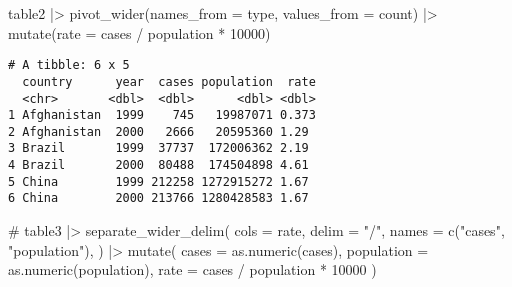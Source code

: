 \documentclass[
  letterpaper,
  DIV=11,
  numbers=noendperiod]{scrreprt}
\newenvironment{Shaded}{\begin{snugshade}}{\end{snugshade}}
\newcommand{\AttributeTok}[1]{\textcolor[rgb]{0.40,0.45,0.13}{#1}}
\newcommand{\CommentTok}[1]{\textcolor[rgb]{0.37,0.37,0.37}{#1}}
\newcommand{\DecValTok}[1]{\textcolor[rgb]{0.68,0.00,0.00}{#1}}
\newcommand{\FunctionTok}[1]{\textcolor[rgb]{0.28,0.35,0.67}{#1}}
\newcommand{\NormalTok}[1]{\textcolor[rgb]{0.00,0.23,0.31}{#1}}
\newcommand{\SpecialCharTok}[1]{\textcolor[rgb]{0.37,0.37,0.37}{#1}}
\newcommand{\StringTok}[1]{\textcolor[rgb]{0.13,0.47,0.30}{#1}}
\begin{document}
\begin{enumerate}
  \begin{tcolorbox}[enhanced jigsaw, left=2mm, rightrule=.15mm, bottomtitle=1mm, opacitybacktitle=0.6, leftrule=.75mm, opacityback=0, colframe=quarto-callout-note-color-frame, bottomrule=.15mm, coltitle=black, toptitle=1mm, colback=white, titlerule=0mm, colbacktitle=quarto-callout-note-color!10!white, title={Answer}, toprule=.15mm, breakable, arc=.35mm]

\begin{Shaded}
\begin{Highlighting}[]
\NormalTok{table2 }\SpecialCharTok{|\textgreater{}}
  \FunctionTok{pivot\_wider}\NormalTok{(}\AttributeTok{names\_from =}\NormalTok{ type,}
              \AttributeTok{values\_from =}\NormalTok{ count) }\SpecialCharTok{|\textgreater{}}
  \FunctionTok{mutate}\NormalTok{(}\AttributeTok{rate =}\NormalTok{ cases }\SpecialCharTok{/}\NormalTok{ population }\SpecialCharTok{*} \DecValTok{10000}\NormalTok{)}
\end{Highlighting}
\end{Shaded}

\begin{verbatim}
# A tibble: 6 x 5
  country      year  cases population  rate
  <chr>       <dbl>  <dbl>      <dbl> <dbl>
1 Afghanistan  1999    745   19987071 0.373
2 Afghanistan  2000   2666   20595360 1.29 
3 Brazil       1999  37737  172006362 2.19 
4 Brazil       2000  80488  174504898 4.61 
5 China        1999 212258 1272915272 1.67 
6 China        2000 213766 1280428583 1.67 
\end{verbatim}

\begin{Shaded}
\begin{Highlighting}[]
\CommentTok{\#}
\NormalTok{table3 }\SpecialCharTok{|\textgreater{}}
  \FunctionTok{separate\_wider\_delim}\NormalTok{(}
    \AttributeTok{cols =}\NormalTok{ rate,}
    \AttributeTok{delim =} \StringTok{"/"}\NormalTok{,}
    \AttributeTok{names =} \FunctionTok{c}\NormalTok{(}\StringTok{"cases"}\NormalTok{, }\StringTok{"population"}\NormalTok{),}
\NormalTok{  ) }\SpecialCharTok{|\textgreater{}}
  \FunctionTok{mutate}\NormalTok{(}
    \AttributeTok{cases =} \FunctionTok{as.numeric}\NormalTok{(cases),}
    \AttributeTok{population =} \FunctionTok{as.numeric}\NormalTok{(population),}
    \AttributeTok{rate =}\NormalTok{ cases }\SpecialCharTok{/}\NormalTok{ population }\SpecialCharTok{*} \DecValTok{10000}
\NormalTok{  )}
\end{Highlighting}
\end{Shaded}


\end{tcolorbox}
\end{enumerate}
\end{document}
